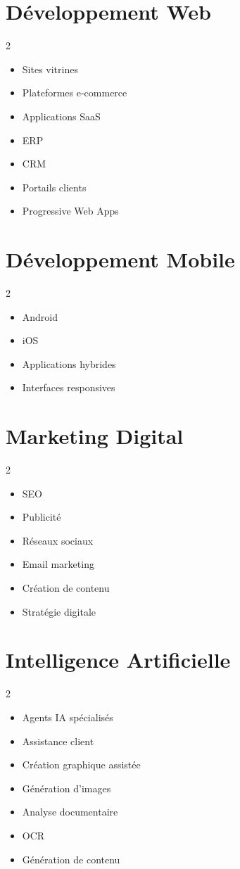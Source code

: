\documentclass[12pt,a4paper,oneside]{book}
\begin{document}
\section{Développement Web}
\begin{multicols}{2}
\begin{itemize}
\item Sites vitrines
\item Plateformes e-commerce
\item Applications SaaS
\item ERP
\item CRM
\item Portails clients
\item Progressive Web Apps
\end{itemize}
\end{multicols}

\section{Développement Mobile}
\begin{multicols}{2}
\begin{itemize}
\item Android
\item iOS
\item Applications hybrides
\item Interfaces responsives
\end{itemize}
\end{multicols}

\section{Marketing Digital}
\begin{multicols}{2}
\begin{itemize}
\item SEO
\item Publicité
\item Réseaux sociaux
\item Email marketing
\item Création de contenu
\item Stratégie digitale
\end{itemize}
\end{multicols}

\section{Intelligence Artificielle}
\begin{multicols}{2}
\begin{itemize}
\item Agents IA spécialisés
\item Assistance client
\item Création graphique assistée
\item Génération d'images
\item Analyse documentaire
\item OCR
\item Génération de contenu
\end{itemize}
\end{multicols}
\end{document}
